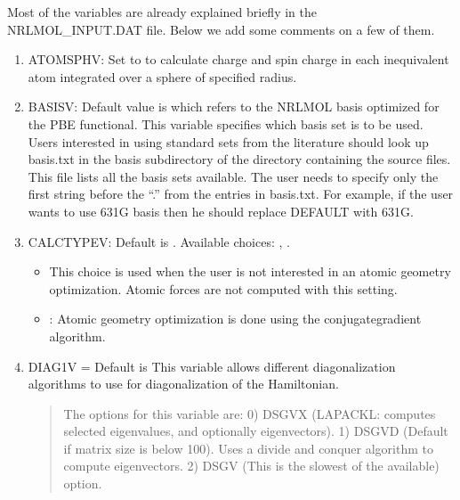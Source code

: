 \documentclass[letterpaper,10pt,english,openany,oneside]{sphinxmanual}
\begin{document}
\sphinxAtStartPar
Most of the variables are already explained briefly in the NRLMOL\_INPUT.DAT file. Below we add some comments on a few of them.
\begin{enumerate}
%
\item {} 
\sphinxAtStartPar
ATOMSPHV: Set to  to calculate charge and spin charge in each inequivalent atom integrated over a sphere of specified  radius.

\item {} 
\sphinxAtStartPar
BASISV: Default value is  which refers to the NRLMOL basis optimized for the PBE functional.
This variable specifies which basis set is to be used. Users interested in using standard sets from the literature should look up basis.txt in the basis
subdirectory of the directory containing the source files. This file lists all the basis sets available. The user
needs to specify only the first string before the “.” from the entries in basis.txt. For example, if the user
wants to use 6\sphinxhyphen{}31G basis then he should replace DEFAULT with 6\sphinxhyphen{}31G.

\item {} 
\sphinxAtStartPar
CALCTYPEV:   Default is .
Available choices:  , .
\begin{itemize}
\item {} 
\sphinxAtStartPar
{} This choice is used when the user is not interested in an atomic geometry optimization. Atomic forces are not computed with this setting.

\item {} 
\sphinxAtStartPar
{} : Atomic geometry optimization is done using the conjugate\sphinxhyphen{}gradient algorithm.

\end{itemize}

\item {} 
\sphinxAtStartPar
DIAG1V        =   Default is 
This variable allows different diagonalization algorithms to use for  diagonalization of the Hamiltonian.
\begin{quote}

\sphinxAtStartPar
The options for this variable are:
0)  DSGVX (LAPACKL: computes selected eigenvalues, and optionally eigenvectors).
1)  DSGVD (Default if matrix size is below 100).  Uses a divide and conquer algorithm to compute eigenvectors.
2)  DSGV   (This is the slowest of the available) option.
\end{quote}


\end{enumerate}
\end{document}
